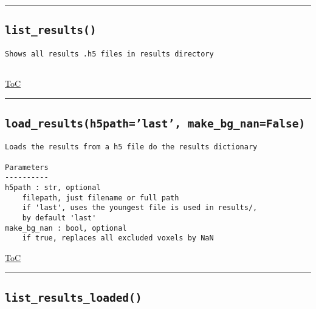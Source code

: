 \documentclass{article}
\begin{document}
\hrule

\subsection*{\texttt{list\_results()}}
\label{fun:listresults}

\begin{lstlisting}[language=docstring]
Shows all results .h5 files in results directory
    
\end{lstlisting}

\begin{flushright}

\hyperref[toc]{ToC}

\end{flushright}



\vspace{5mm}

\hrule

\subsection*{\texttt{load\_results(h5path='last', make\_bg\_nan=False)}}
\label{fun:loadresults}

\begin{lstlisting}[language=docstring]
Loads the results from a h5 file do the results dictionary

Parameters
----------
h5path : str, optional
    filepath, just filename or full path
    if 'last', uses the youngest file is used in results/, 
    by default 'last'
make_bg_nan : bool, optional
    if true, replaces all excluded voxels by NaN
\end{lstlisting}

\begin{flushright}

\hyperref[toc]{ToC}

\end{flushright}



\vspace{5mm}

\hrule

\subsection*{\texttt{list\_results\_loaded()}}
\label{fun:listresultsloaded}
\end{document}
